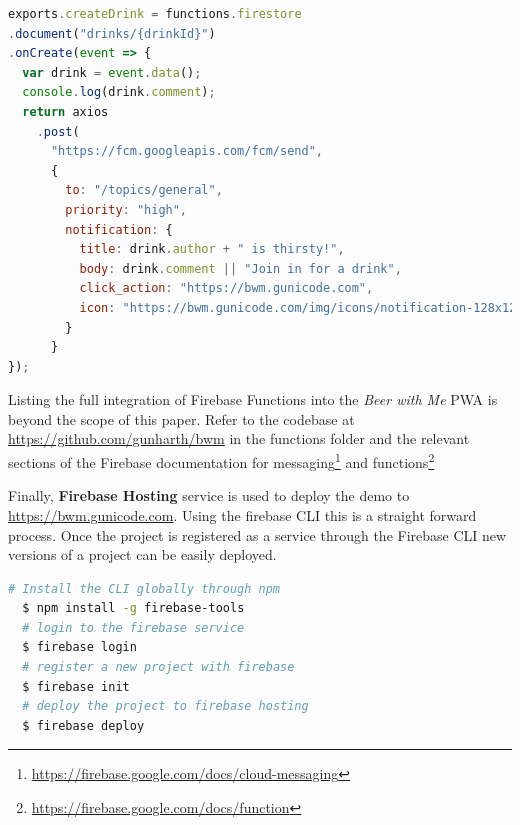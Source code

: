 \begin{lstlisting}[language=JavaScript, caption=Firebase Functions calling the messaging service when a new post is created in the Firestore database(functions/index.js), label=lst:firebase-function]
exports.createDrink = functions.firestore
.document("drinks/{drinkId}")
.onCreate(event => {
  var drink = event.data();
  console.log(drink.comment);
  return axios
    .post(
      "https://fcm.googleapis.com/fcm/send",
      {
        to: "/topics/general",
        priority: "high",
        notification: {
          title: drink.author + " is thirsty!",
          body: drink.comment || "Join in for a drink",
          click_action: "https://bwm.gunicode.com",
          icon: "https://bwm.gunicode.com/img/icons/notification-128x128.png"
        }
      }
});
\end{lstlisting}

Listing the full integration of Firebase Functions into the \textit{Beer with Me} PWA is beyond the scope of this paper. Refer to the codebase at \url{https://github.com/gunharth/bwm} in the functions folder and the relevant sections of the Firebase documentation for messaging\footnote{\url{https://firebase.google.com/docs/cloud-messaging}} and functions\footnote{\url{https://firebase.google.com/docs/function}}

Finally, \textbf{Firebase Hosting} service is used to deploy the demo to \url{https://bwm.gunicode.com}. Using the firebase CLI this is a straight forward process. Once the project is registered as a service through the Firebase CLI new versions of a project can be easily deployed.

\begin{lstlisting}[language=bash, caption=Firebase CLI commands, label=lst:vue-cli]
  # Install the CLI globally through npm
  $ npm install -g firebase-tools
  # login to the firebase service
  $ firebase login
  # register a new project with firebase
  $ firebase init
  # deploy the project to firebase hosting
  $ firebase deploy
\end{lstlisting}
